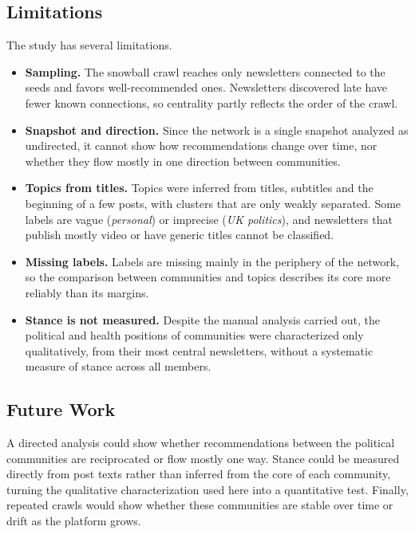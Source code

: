 \documentclass[sigchi]{acmart}
\begin{document}
\subsection{Limitations}
The study has several limitations.
\begin{itemize}
   \item \textbf{Sampling.} The snowball crawl reaches only newsletters connected to the seeds and favors well-recommended ones. Newsletters discovered late have fewer known connections, so centrality partly reflects the order of the crawl.
  \item \textbf{Snapshot and direction.} Since the network is a single snapshot analyzed as undirected, it cannot show how recommendations change over time, nor whether they flow mostly in one direction between communities.
  \item \textbf{Topics from titles.} Topics were inferred from titles, subtitles and the beginning of a few posts, with clusters that are
  only weakly separated. Some labels are vague (\emph{personal}) or imprecise (\emph{UK politics}), and newsletters that publish mostly video or have generic titles cannot be classified.
  \item \textbf{Missing labels.} Labels are missing mainly in the
  periphery of the network, so the comparison between communities and
  topics describes its core more reliably than its margins.
  \item \textbf{Stance is not measured.}   Despite the manual analysis carried out, the political and health
  positions of communities were characterized only qualitatively, from their most central newsletters, without a systematic measure of
  stance across all members.
\end{itemize}

\subsection{Future Work}
A directed analysis could show whether recommendations between the political communities are reciprocated or flow mostly one way. Stance
could be measured directly from post texts rather than inferred from the core of each community, turning the qualitative characterization
used here into a quantitative test. Finally, repeated crawls would show whether these communities are stable over time or drift as the platform grows.



\end{document}
